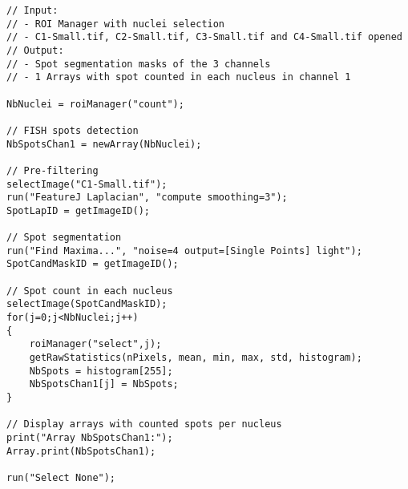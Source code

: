 \begin{lstlisting}
// Input: 
// - ROI Manager with nuclei selection
// - C1-Small.tif, C2-Small.tif, C3-Small.tif and C4-Small.tif opened
// Output: 
// - Spot segmentation masks of the 3 channels
// - 1 Arrays with spot counted in each nucleus in channel 1

NbNuclei = roiManager("count");

// FISH spots detection
NbSpotsChan1 = newArray(NbNuclei);

// Pre-filtering
selectImage("C1-Small.tif");
run("FeatureJ Laplacian", "compute smoothing=3");
SpotLapID = getImageID();
	
// Spot segmentation
run("Find Maxima...", "noise=4 output=[Single Points] light");
SpotCandMaskID = getImageID();
	
// Spot count in each nucleus
selectImage(SpotCandMaskID);
for(j=0;j<NbNuclei;j++)
{ 	
	roiManager("select",j);
	getRawStatistics(nPixels, mean, min, max, std, histogram);
	NbSpots = histogram[255];
	NbSpotsChan1[j] = NbSpots;
}

// Display arrays with counted spots per nucleus
print("Array NbSpotsChan1:");
Array.print(NbSpotsChan1);

run("Select None");
\end{lstlisting}